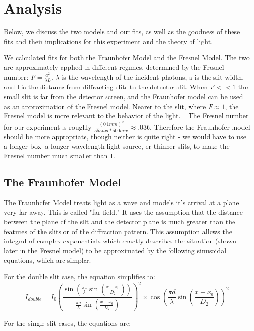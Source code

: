 \documentclass[prb,preprint]{revtex4-1}
\begin{document}
\section{Analysis}

Below, we discuss the two models and our fits, as well as the goodness of these fits and their implications for this experiment and the theory of light.

We calculated fits for both the Fraunhofer Model and the Fresnel Model.  The two are approximately applied in different regimes, determined by the Fresnel number: $F = \frac{a^2}{\lambda L}$.  $\lambda$ is the wavelength of the incident photons, a is the slit width, and l is the distance from diffracting slits to the detector slit.  When $F << 1$ the small slit is far from the detector screen, and the Fraunhofer model can be used as an approximation of the Fresnel model.  Nearer to the slit, where $F \approx 1$, the Fresnel model is more relevant to the behavior of the light. ~\cite{wolfram} The Fresnel number for our experiment is roughly $\frac{(0.1mm)^2}{555nm*500mm} \approx .036$.  Therefore the Fraunhofer model should be more appropriate, though neither is quite right - we would have to use a longer box, a longer wavelength light source, or thinner slits, to make the Fresnel number much smaller than $1$. 

\subsection{The Fraunhofer Model}

The Fraunhofer Model treats light as a wave and models it's arrival at a plane very far away. This is called "far field." It uses the assumption that the distance between the plane of the slit and the detector plane is much greater than the features of the slits or of the diffraction pattern.  This assumption allows the integral of complex exponentials which exactly describes the situation (shown later in the Fresnel model) to be approximated by the following sinusoidal equations, which are simpler. ~\cite{wolfram}

For the double slit case, the equation simplifies to:
\begin{equation}
I_{double}= I_{0}(\frac{\sin(\frac{\pi a}{\lambda}\sin(\frac{x-x_{0}}{D_{2}}))}{\frac{\pi a}{\lambda}\sin(\frac{x-x_{0}}{D_{2}})})^{2} \times \cos(\frac{\pi d}{\lambda}\sin(\frac{x-x_{0}}{D_{2}}))^{2}
\end{equation}

For the single slit cases, the equations are: 
\end{document}
